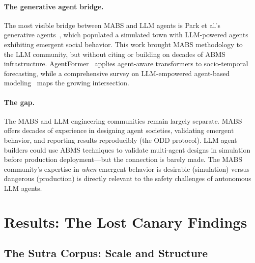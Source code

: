 \documentclass{article}
\begin{document}
\paragraph{The generative agent bridge.}
The most visible bridge between MABS and LLM agents is Park et al.'s generative
agents~\citep{park2023generative}, which populated a simulated town with LLM-powered
agents exhibiting emergent social behavior. This work brought MABS methodology to the
LLM community, but without citing or building on decades of ABMS infrastructure.
AgentFormer~\citep{sutra220_agentformer2021} applies agent-aware transformers to
socio-temporal forecasting, while a comprehensive survey on LLM-empowered
agent-based modeling~\citep{sutra14292_large2024} maps the growing intersection.

\paragraph{The gap.}
The MABS and LLM engineering communities remain largely separate. MABS offers
decades of experience in designing agent societies, validating emergent behavior,
and reporting results reproducibly (the ODD protocol). LLM agent builders could
use ABMS techniques to validate multi-agent designs in simulation before production
deployment---but the connection is barely made. The MABS community's expertise in
\emph{when} emergent behavior is desirable (simulation) versus dangerous (production)
is directly relevant to the safety challenges of autonomous LLM agents.

\section{Results: The Lost Canary Findings}
\label{sec:results}

\subsection{The Sutra Corpus: Scale and Structure}
\label{sec:res-corpus}

%
%
%
%
%
\end{document}
